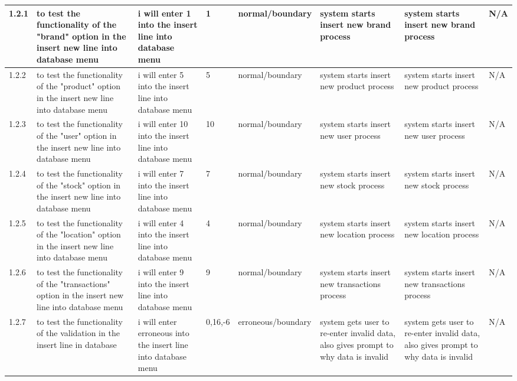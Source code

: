 \begin{landscape}
\begin{center}
\begin{longtable}{|p{1.5cm}|p{2.5cm}|p{2.5cm}|p{2cm}|p{2cm}|p{2cm}|p{2cm}|p{2cm}|}
1.2.1 & to test the functionality of the "brand" option in the insert new line into database menu & i will enter 1 into the insert line into database menu  & 1 & normal/boundary & system starts insert new brand process & system starts insert new brand process & N/A \\ \hline
1.2.2 & to test the functionality of the "product" option in the insert new line into database menu & i will enter 5 into the insert line into database menu & 5 & normal/boundary & system starts insert new product process & system starts insert new product process & N/A \\ \hline
1.2.3 & to test the functionality of the "user" option in the insert new line into database menu & i will enter 10 into the insert line into database menu & 10 & normal/boundary & system starts insert new user process & system starts insert new user process & N/A \\ \hline
1.2.4 & to test the functionality of the "stock" option in the insert new line into database menu & i will enter 7 into the insert line into database menu & 7 & normal/boundary & system starts insert new stock process & system starts insert new stock process & N/A \\ \hline
1.2.5 & to test the functionality of the "location" option in the insert new line into database menu & i will enter 4 into the insert line into database menu & 4 & normal/boundary & system starts insert new location process & system starts insert new location process & N/A \\ \hline
1.2.6 & to test the functionality of the "transactions" option in the insert new line into database menu & i will enter 9 into the insert line into database menu & 9 & normal/boundary & system starts insert new transactions process & system starts insert new transactions process & N/A \\ \hline
1.2.7 & to test the functionality of the validation in the insert line in database & i will enter erroneous into the insert line into database menu & 0,16,-6 & erroneous/boundary & system gets user to re-enter invalid data, also gives prompt to why data is invalid & system gets user to re-enter invalid data, also gives prompt to why data is invalid & N/A \\ \hline


\end{longtable}
\end{center}
\end{landscape}
